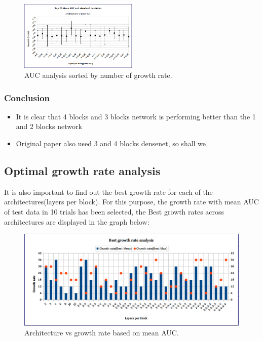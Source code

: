 \begin{figure}[h]
\centering
\includegraphics[width=0.5\textwidth]{images/densenet/auc_analysis_sortedby_growth.png}
\caption{\label{fig:meanAUC_growth}AUC analysis sorted by number of growth rate.}
\end{figure}

\subsubsection{Conclusion}
\begin{itemize}
 \item It is clear that 4 blocks and 3 blocks network is performing better than the 1 and 2 blocks network
 \item Original paper also used 3 and 4 blocks densenet, so shall we
\end{itemize}

\subsection{Optimal growth rate analysis}
It is also important to find out the best growth rate for each of the architectures(layers per block). For this purpose, the growth rate with mean AUC of test data in 10 trials has been selected,
the Best growth rates across architectures are displayed in the graph below: 

\begin{figure}[h]
\centering
\includegraphics[width=1\textwidth]{images/densenet/best_growthrate_analysis.png}
\caption{\label{fig:best_growthrate}Architecture vs growth rate based on mean AUC.}
\end{figure}


